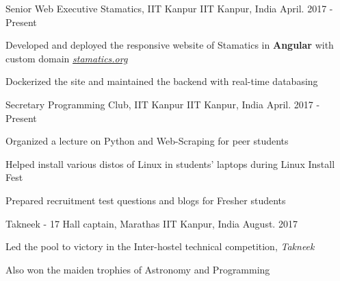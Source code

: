 


\begin{cventries}

  \cventry
    {Senior Web Executive }
    {Stamatics, IIT Kanpur}
    {IIT Kanpur, India}
    {April. 2017 - Present}
    {
      \begin{cvitems}
        \item Developed and deployed the responsive website of Stamatics in \textbf{Angular} with custom domain \href{http://stamatics.org}{\textit{stamatics.org}}
  \item Dockerized the site and maintained the backend with real-time databasing
      \end{cvitems}
    }

  \cventry
    {Secretary }
    {Programming Club, IIT Kanpur}
    {IIT Kanpur, India}
    {April. 2017 - Present}
    {
      \begin{cvitems}
		\item Organized a lecture on Python and Web-Scraping for peer students
    \item Helped install various distos of Linux in students' laptops during Linux Install Fest
    \item Prepared recruitment test questions and blogs for Fresher students
      \end{cvitems}
    }
    
  \cventry
    {Takneek - 17 }
    {Hall captain, Marathas}
    {IIT Kanpur, India}
    {August. 2017}
    {
      \begin{cvitems}
        \item Led the pool to victory in the Inter-hostel technical competition, \textit{Takneek}
    \item Also won the maiden trophies of Astronomy and Programming
      \end{cvitems}
    }

  
\end{cventries}

